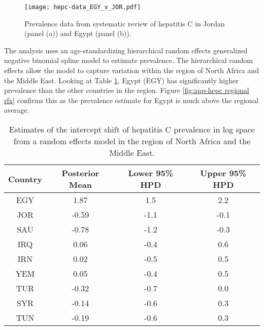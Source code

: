     \begin{figure}[h]
        \begin{center}
            \texttt{[image: hepc-data\_EGY\_v\_JOR.pdf]}
            \caption{Prevalence data from systematic review of hepatitis C in Jordan (panel (a)) and Egypt (panel (b)).}
            \label{fig:app-hepc data}
        \end{center}
    \end{figure}

The analysis uses an age-standardizing hierarchical random effects generalized negative binomial spline model to estimate prevalence.  The hierarchical random effects allow the model to capture variation within the region of North Africa and the Middle East.  Looking at Table \ref{tab:app-hepc regional rfx}, Egypt (EGY) has significantly higher prevalence than the other countries in the region.  Figure \ref{fig:app-hepc regional rfx} confirms this as the prevalence estimate for Egypt is much above the regional average.

    \begin{table}[h]
        \begin{center}
        \caption{ Estimates of the intercept shift of hepatitis C prevalence in log space from a random effects model in the region of North Africa and the Middle East.}
        \label{tab:app-hepc regional rfx}
        \begin{tabular}{|c|c|c|c|}
            \hline
                Country & Posterior Mean & Lower 95\% HPD  & Upper 95\%  HPD \\
            \hline
                EGY	&	1.87	&	 1.5	&	2.2	\\
                JOR	&	-0.59	&	-1.1	&	-0.1 \\
                SAU	&	-0.78	&	-1.2	&	-0.3 \\
                IRQ	&	0.06	&	-0.4	&	0.6	\\
                IRN	&	0.02	&	-0.5	&	0.5	\\
                YEM	&	0.05	&	-0.4	&	0.5	\\
                TUR	&	-0.32	&	-0.7	&	0.0	\\
                SYR	&	-0.14	&	-0.6	&	0.3	\\
                TUN	&	-0.19	&	-0.6	&	0.3	\\
            \hline
        \end{tabular}
        \end{center}
    \end{table}

